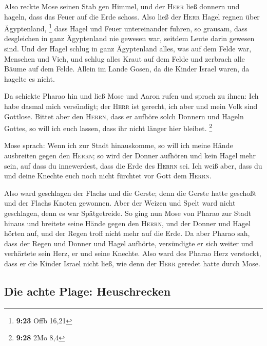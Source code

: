  Also reckte Mose seinen Stab gen Himmel, und der
\textsc{Herr} ließ donnern und hageln, dass das Feuer auf die Erde
schoss. Also ließ der \textsc{Herr} Hagel regnen über Ägyptenland,
\footnote{\textbf{9:23} Offb 16,21}  dass Hagel und Feuer
untereinander fuhren, so grausam, dass desgleichen in ganz Ägyptenland
nie gewesen war, seitdem Leute darin gewesen sind.  Und
der Hagel schlug in ganz Ägyptenland alles, was auf dem Felde war,
Menschen und Vieh, und schlug alles Kraut auf dem Felde und zerbrach
alle Bäume auf dem Felde.  Allein im Lande Gosen, da die
Kinder Israel waren, da hagelte es nicht.

 Da schickte Pharao hin und ließ Mose und Aaron rufen und
sprach zu ihnen: Ich habe dasmal mich versündigt; der \textsc{Herr} ist
gerecht, ich aber und mein Volk sind Gottlose.  Bittet
aber den \textsc{Herrn}, dass er aufhöre solch Donnern und Hageln
Gottes, so will ich euch lassen, dass ihr nicht länger hier bleibet.
\footnote{\textbf{9:28} 2Mo 8,4}

 Mose sprach: Wenn ich zur Stadt hinauskomme, so will ich
meine Hände ausbreiten gegen den \textsc{Herrn}; so wird der Donner
aufhören und kein Hagel mehr sein, auf dass du innewerdest, dass die
Erde des \textsc{Herrn} sei.  Ich weiß aber, dass du und
deine Knechte euch noch nicht fürchtet vor Gott dem \textsc{Herrn}.

 Also ward geschlagen der Flachs und die Gerste; denn die
Gerste hatte geschoßt und der Flachs Knoten gewonnen. 
Aber der Weizen und Spelt ward nicht geschlagen, denn es war
Spätgetreide.  So ging nun Mose von Pharao zur Stadt
hinaus und breitete seine Hände gegen den \textsc{Herrn}, und der Donner
und Hagel hörten auf, und der Regen troff nicht mehr auf die Erde.
 Da aber Pharao sah, dass der Regen und Donner und Hagel
aufhörte, versündigte er sich weiter und verhärtete sein Herz, er und
seine Knechte.  Also ward des Pharao Herz verstockt, dass
er die Kinder Israel nicht ließ, wie denn der \textsc{Herr} geredet
hatte durch Mose.

\hypertarget{die-achte-plage-heuschrecken}{%
\subsection{Die achte Plage:
Heuschrecken}\label{die-achte-plage-heuschrecken}}

